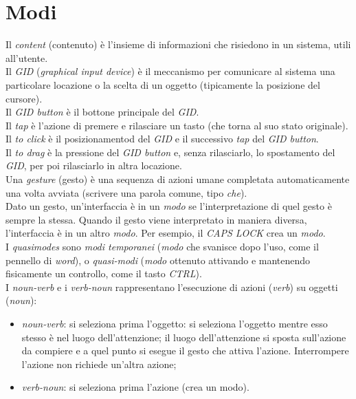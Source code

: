 \section{Modi}
Il \textit{content} (contenuto) \`e l'insieme di informazioni che risiedono in un sistema, utili all'utente. \\
Il \textit{GID} (\textit{graphical input device}) \`e il meccanismo per comunicare al sistema una particolare locazione o la scelta di un oggetto (tipicamente la posizione del cursore). \\
Il \textit{GID button} \`e il bottone principale del \textit{GID}. \\
Il \textit{tap} \`e l'azione di premere e rilasciare un tasto (che torna al suo stato originale). \\
Il \textit{to click} \`e il posizionamentod del \textit{GID} e il successivo \textit{tap} del \textit{GID button}. \\
Il \textit{to drag} \`e la pressione del \textit{GID button} e, senza rilasciarlo, lo spostamento del \textit{GID}, per poi rilasciarlo in altra locazione. \\
Una \textit{gesture} (gesto) \`e una sequenza di azioni umane completata automaticamente una volta avviata (scrivere una parola comune, tipo \textit{che}). \\
Dato un gesto, un'interfaccia \`e in un \textit{modo} se l'interpretazione di quel gesto \`e sempre la stessa. Quando il gesto viene interpretato in maniera diversa, l'interfaccia \`e in un altro \textit{modo}. Per esempio, il \textit{CAPS LOCK} crea un \textit{modo}. \\
I \textit{quasimodes} sono \textit{modi temporanei} (\textit{modo} che svanisce dopo l'uso, come il pennello di \textit{word}), o \textit{quasi-modi} (\textit{modo} ottenuto attivando e mantenendo fisicamente un controllo, come il tasto \textit{CTRL}). \\
I \textit{noun-verb} e i \textit{verb-noun} rappresentano l'esecuzione di azioni (\textit{verb}) su oggetti (\textit{noun}):
\begin{itemize}
	\item \textit{noun-verb}: si seleziona prima l'oggetto: si seleziona l'oggetto mentre esso stesso \`e nel luogo dell'attenzione; il luogo dell'attenzione si sposta sull'azione da compiere e a quel punto si esegue il gesto che attiva l'azione. Interrompere l'azione non richiede un'altra azione;
	\item \textit{verb-noun}: si seleziona prima l'azione (crea un modo).
\end{itemize}
